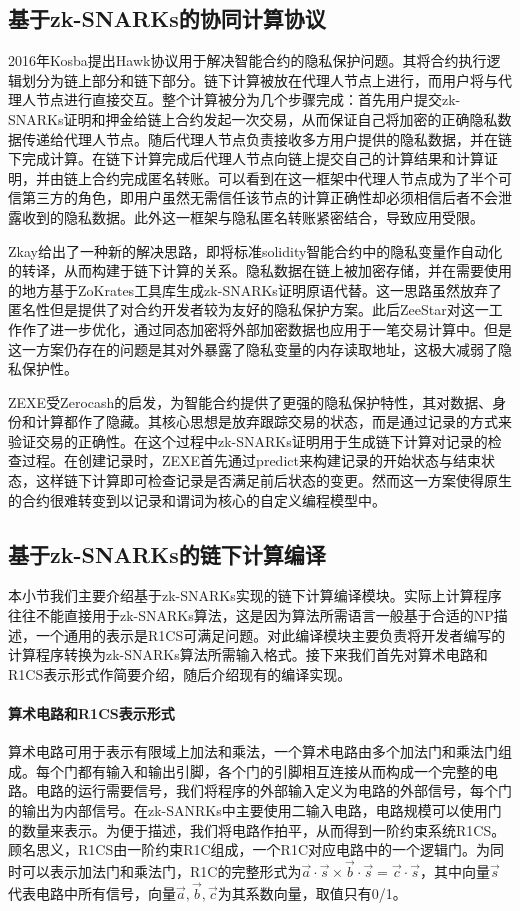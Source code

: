 \subsection{基于zk-SNARKs的协同计算协议}
2016年Kosba提出Hawk\cite{7546538}协议用于解决智能合约的隐私保护问题。其将合约执行逻辑划分为链上部分和链下部分。链下计算被放在代理人节点上进行，而用户将与代理人节点进行直接交互。整个计算被分为几个步骤完成：首先用户提交zk-SNARKs证明和押金给链上合约发起一次交易，从而保证自己将加密的正确隐私数据传递给代理人节点。随后代理人节点负责接收多方用户提供的隐私数据，并在链下完成计算。在链下计算完成后代理人节点向链上提交自己的计算结果和计算证明，并由链上合约完成匿名转账。可以看到在这一框架中代理人节点成为了半个可信第三方的角色，即用户虽然无需信任该节点的计算正确性却必须相信后者不会泄露收到的隐私数据。此外这一框架与隐私匿名转账紧密结合，导致应用受限。

Zkay\cite{2020arXiv200901020B}给出了一种新的解决思路，即将标准solidity智能合约中的隐私变量作自动化的转译，从而构建于链下计算的关系。隐私数据在链上被加密存储，并在需要使用的地方基于ZoKrates\cite{8726497}工具库生成zk-SNARKs证明原语代替。这一思路虽然放弃了匿名性但是提供了对合约开发者较为友好的隐私保护方案。此后ZeeStar\cite{9833732}对这一工作作了进一步优化，通过同态加密将外部加密数据也应用于一笔交易计算中。但是这一方案仍存在的问题是其对外暴露了隐私变量的内存读取地址，这极大减弱了隐私保护性。

ZEXE\cite{9152634}受Zerocash\cite{6956581}的启发，为智能合约提供了更强的隐私保护特性，其对数据、身份和计算都作了隐藏。其核心思想是放弃跟踪交易的状态，而是通过记录的方式来验证交易的正确性。在这个过程中zk-SNARKs证明用于生成链下计算对记录的检查过程。在创建记录时，ZEXE首先通过predict来构建记录的开始状态与结束状态，这样链下计算即可检查记录是否满足前后状态的变更。然而这一方案使得原生的合约很难转变到以记录和谓词为核心的自定义编程模型中。
\subsection{基于zk-SNARKs的链下计算编译}
本小节我们主要介绍基于zk-SNARKs实现的链下计算编译模块。实际上计算程序往往不能直接用于zk-SNARKs算法，这是因为算法所需语言一般基于合适的NP描述，一个通用的表示是R1CS可满足问题\cite{10.1007/978-3-030-56877-1_25}。对此编译模块主要负责将开发者编写的计算程序转换为zk-SNARKs算法所需输入格式。接下来我们首先对算术电路和R1CS表示形式作简要介绍，随后介绍现有的编译实现。

\paragraph{算术电路和R1CS表示形式} 算术电路可用于表示有限域上加法和乘法，一个算术电路由多个加法门和乘法门组成。每个门都有输入和输出引脚，各个门的引脚相互连接从而构成一个完整的电路。电路的运行需要信号，我们将程序的外部输入定义为电路的外部信号，每个门的输出为内部信号。在zk-SANRKs中主要使用二输入电路，电路规模可以使用门的数量来表示。为便于描述，我们将电路作拍平，从而得到一阶约束系统R1CS。顾名思义，R1CS由一阶约束R1C组成，一个R1C对应电路中的一个逻辑门。为同时可以表示加法门和乘法门，R1C的完整形式为$\vec{a} \cdot \vec{s} \times \vec{b} \cdot \vec{s} = \vec{c} \cdot \vec{s}$，其中向量$\vec{s}$代表电路中所有信号，向量$\vec{a}, \vec{b}, \vec{c}$为其系数向量，取值只有0/1。


